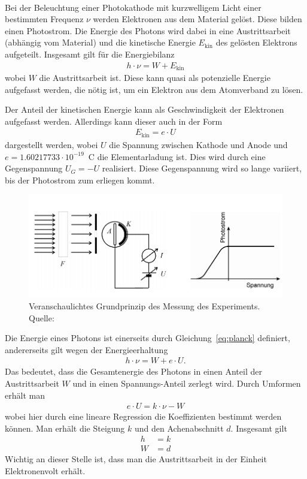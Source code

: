 \documentclass{article}
\newcommand{\Ekin}{E_\text{kin}}
\begin{document}
~

Bei der Beleuchtung einer Photokathode mit kurzwelligem Licht einer bestimmten Frequenz $\nu$ werden Elektronen aus dem Material gelöst. Diese bilden einen Photostrom. Die Energie des Photons wird dabei in eine Austrittsarbeit (abhängig vom Material) und die kinetische Energie $\Ekin$ des gelösten Elektrons aufgeteilt. Insgesamt gilt für die Energiebilanz
\begin{align*}
h\cdot \nu = W + \Ekin
\end{align*}
wobei $W$ die Austrittsarbeit ist. Diese kann quasi als potenzielle Energie aufgefasst werden, die nötig ist, um ein Elektron aus dem Atomverband zu lösen.

Der Anteil der kinetischen Energie kann als Geschwindigkeit der Elektronen aufgefasst werden. Allerdings kann dieser auch in der Form 
\begin{align}
\Ekin = e\cdot U
\end{align}
dargestellt werden, wobei $U$ die Spannung zwischen Kathode und Anode und $e = 1.60217733 \cdot 10^{-19}$~C die Elementarladung ist. Dies wird durch eine Gegenspannung $U_G = -U$ realisiert. Diese Gegenspannung wird so lange variiert, bis der Photostrom zum erliegen kommt.




\begin{figure}[H]
\includegraphics[scale=1.4]{versuch1.png}
\caption{Veranschaulichtes Grundprinzip des Messung des Experiments. Quelle: \cite{moodle}}
\end{figure}

Die Energie eines Photons ist einerseits durch Gleichung~\eqref{eq:planck} definiert, andererseits gilt wegen der Energieerhaltung
\begin{align}
h\cdot \nu = W + e\cdot U.
\end{align}
Das bedeutet, dass die Gesamtenergie des Photons in einen Anteil der Austrittsarbeit $W$ und in einen Spannungs-Anteil zerlegt wird.
Durch Umformen erhält man
\begin{align}
e\cdot U = k\cdot \nu - W \label{eq:regr_def1}
\end{align}
wobei hier durch eine lineare Regression die Koeffizienten bestimmt werden können. Man erhält die Steigung $k$ und den Achenabschnitt $d$. Insgesamt gilt 
\begin{align}
h &= k \\
W &= d
\end{align}
Wichtig an dieser Stelle ist, dass man die Austrittsarbeit in der Einheit Elektronenvolt erhält.
\end{document}

